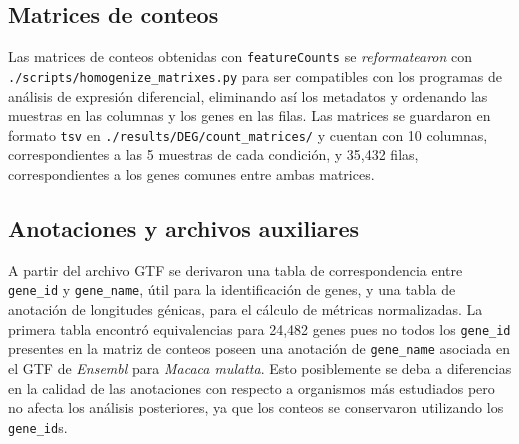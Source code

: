 \documentclass[
  12pt,
  letterpaper,
  DIV=11,
  numbers=noendperiod]{scrartcl}
\newenvironment{Shaded}{\begin{snugshade}}{\end{snugshade}}
\newcommand{\AttributeTok}[1]{\textcolor[rgb]{0.40,0.45,0.13}{#1}}
\newcommand{\CommentTok}[1]{\textcolor[rgb]{0.37,0.37,0.37}{#1}}
\newcommand{\DataTypeTok}[1]{\textcolor[rgb]{0.68,0.00,0.00}{#1}}
\newcommand{\DecValTok}[1]{\textcolor[rgb]{0.68,0.00,0.00}{#1}}
\newcommand{\ExtensionTok}[1]{\textcolor[rgb]{0.00,0.23,0.31}{#1}}
\newcommand{\NormalTok}[1]{\textcolor[rgb]{0.00,0.23,0.31}{#1}}
\newcommand{\OperatorTok}[1]{\textcolor[rgb]{0.37,0.37,0.37}{#1}}
\newcommand{\PreprocessorTok}[1]{\textcolor[rgb]{0.68,0.00,0.00}{#1}}
\newcommand{\StringTok}[1]{\textcolor[rgb]{0.13,0.47,0.30}{#1}}
\newcommand{\VariableTok}[1]{\textcolor[rgb]{0.07,0.07,0.07}{#1}}
\begin{document}
\begin{Shaded}
\end{Shaded}

\subsection{Matrices de conteos}\label{matrices-de-conteos}

Las matrices de conteos obtenidas con \texttt{featureCounts} se
\emph{reformatearon} con \texttt{./scripts/homogenize\_matrixes.py} para
ser compatibles con los programas de análisis de expresión diferencial,
eliminando así los metadatos y ordenando las muestras en las columnas y
los genes en las filas. Las matrices se guardaron en formato
\texttt{tsv} en \texttt{./results/DEG/count\_matrices/} y cuentan con 10
columnas, correspondientes a las 5 muestras de cada condición, y 35,432
filas, correspondientes a los genes comunes entre ambas matrices.

\subsection{Anotaciones y archivos
auxiliares}\label{anotaciones-y-archivos-auxiliares}

A partir del archivo GTF se derivaron una tabla de correspondencia entre
\texttt{gene\_id} y \texttt{gene\_name}, útil para la identificación de
genes, y una tabla de anotación de longitudes génicas, para el cálculo
de métricas normalizadas. La primera tabla encontró equivalencias para
24,482 genes pues no todos los \texttt{gene\_id} presentes en la matriz
de conteos poseen una anotación de \texttt{gene\_name} asociada en el
GTF de \emph{Ensembl} para \emph{Macaca mulatta}. Esto posiblemente se
deba a diferencias en la calidad de las anotaciones con respecto a
organismos más estudiados pero no afecta los análisis posteriores, ya
que los conteos se conservaron utilizando los \texttt{gene\_id}s.
\end{document}

